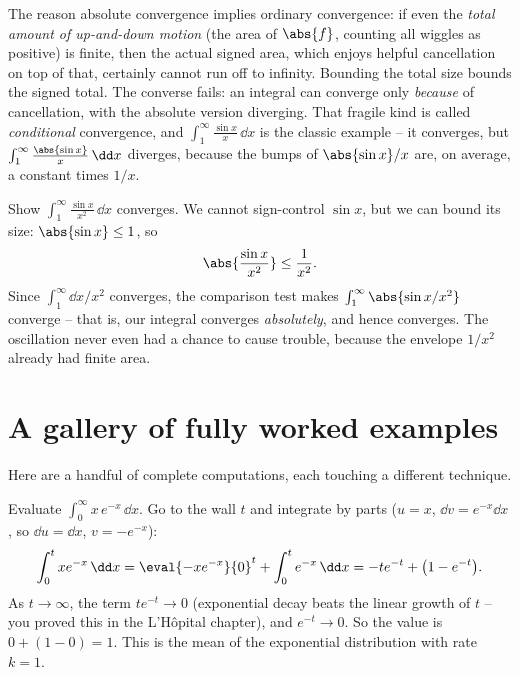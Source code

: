 \begin{intuitionbox}
The reason absolute convergence implies ordinary convergence: if even the
\emph{total amount of up-and-down motion} (the area of $\abs{f}$, counting all
wiggles as positive) is finite, then the actual signed area, which enjoys helpful
cancellation on top of that, certainly cannot run off to infinity. Bounding the
total size bounds the signed total. The converse fails: an integral can converge
only \emph{because} of cancellation, with the absolute version diverging. That
fragile kind is called \emph{conditional} convergence, and $\int_1^\infty
\frac{\sin x}{x}\,\dd x$ is the classic example -- it converges, but $\int_1^\infty
\frac{\abs{\sin x}}{x}\,\dd x$ diverges, because the bumps of $\abs{\sin x}/x$ are,
on average, a constant times $1/x$.
\end{intuitionbox}

\begin{example}
\label{ch25:ex-abs}
Show $\displaystyle\int_1^{\infty}\frac{\sin x}{x^2}\,\dd x$ converges. We cannot
sign-control $\sin x$, but we can bound its size: $\abs{\sin x}\le 1$, so
\[
  \abs{\frac{\sin x}{x^2}} \le \frac{1}{x^2}.
\]
Since $\int_1^\infty \dd x/x^2$ converges, the comparison test makes
$\int_1^\infty \abs{\sin x / x^2}$ converge -- that is, our integral converges
\emph{absolutely}, and hence converges. The oscillation never even had a chance to
cause trouble, because the envelope $1/x^2$ already had finite area.
\end{example}

\section{A gallery of fully worked examples}
\label{ch25:gallery}

Here are a handful of complete computations, each touching a different technique.

\begin{example}
\label{ch25:ex-parts}
Evaluate $\displaystyle\int_0^{\infty} x\,e^{-x}\,\dd x$. Go to the wall $t$ and
integrate by parts ($u = x$, $\dd v = e^{-x}\dd x$, so $\dd u = \dd x$,
$v = -e^{-x}$):
\[
  \int_0^{t} x e^{-x}\,\dd x
  = \eval{-x e^{-x}}{0}^{t} + \int_0^{t} e^{-x}\,\dd x
  = -t e^{-t} + \bigl(1 - e^{-t}\bigr).
\]
As $t\to\infty$, the term $t e^{-t}\to 0$ (exponential decay beats the linear
growth of $t$ -- you proved this in the L'H\^opital chapter), and $e^{-t}\to 0$.
So the value is $0 + (1 - 0) = 1$. This is the mean of the exponential
distribution with rate $k=1$.
\end{example}

